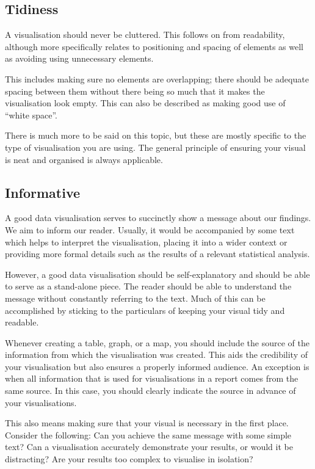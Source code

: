 \documentclass[
]{book}
\begin{document}
\hypertarget{tidiness}{%
\subsection{Tidiness}\label{tidiness}}

A visualisation should never be cluttered. This follows on from readability, although more specifically relates to positioning and spacing of elements as well as avoiding using unnecessary elements.

This includes making sure no elements are overlapping; there should be adequate spacing between them without there being so much that it makes the visualisation look empty. This can also be described as making good use of ``white space''.

There is much more to be said on this topic, but these are mostly specific to the type of visualisation you are using. The general principle of ensuring your visual is neat and organised is always applicable.

\hypertarget{informative}{%
\subsection{Informative}\label{informative}}

A good data visualisation serves to succinctly show a message about our findings. We aim to inform our reader. Usually, it would be accompanied by some text which helps to interpret the visualisation, placing it into a wider context or providing more formal details such as the results of a relevant statistical analysis.

However, a good data visualisation should be self-explanatory and should be able to serve as a stand-alone piece. The reader should be able to understand the message without constantly referring to the text. Much of this can be accomplished by sticking to the particulars of keeping your visual tidy and readable.

Whenever creating a table, graph, or a map, you should include the source of the information from which the visualisation was created. This aids the credibility of your visualisation but also ensures a properly informed audience. An exception is when all information that is used for visualisations in a report comes from the same source. In this case, you should clearly indicate the source in advance of your visualisations.

This also means making sure that your visual is necessary in the first place. Consider the following: Can you achieve the same message with some simple text? Can a visualisation accurately demonstrate your results, or would it be distracting? Are your results too complex to visualise in isolation?
\end{document}
